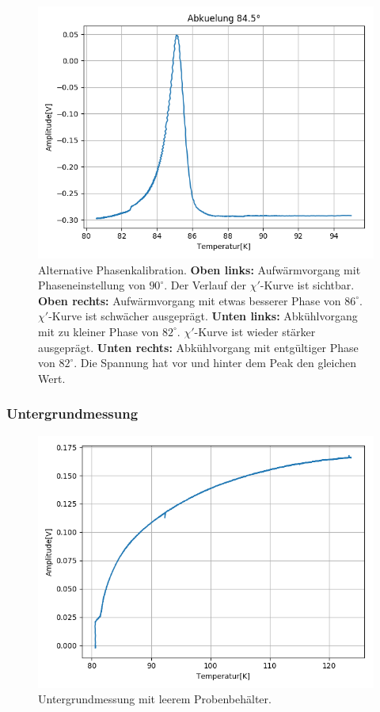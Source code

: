 \documentclass[12pt,a4paper]{article}
\begin{document}
\begin{figure}
\includegraphics[scale=0.5]{Bilder/Haupt_Supra/Kal_3.png}
\caption{Alternative Phasenkalibration. \textbf{Oben links:} Aufwärmvorgang mit Phaseneinstellung von $90^\circ$. Der Verlauf der $\chi'$-Kurve ist sichtbar. \textbf{Oben rechts:} Aufwärmvorgang mit etwas besserer Phase von $86^\circ$. $\chi'$-Kurve ist schwächer ausgeprägt. \textbf{Unten links:} Abkühlvorgang mit zu kleiner Phase von $82^\circ$. $\chi'$-Kurve ist wieder stärker ausgeprägt. \textbf{Unten rechts:} Abkühlvorgang mit entgültiger  Phase von $82^\circ$. Die Spannung hat vor und hinter dem Peak den gleichen Wert.}
\label{fig:Supra_Kali}
\end{figure}

\subsubsection{Untergrundmessung}
\begin{figure}
\centering
\includegraphics[scale=0.8]{Bilder/Haupt_Supra/Untergrund.png}
\caption{Untergrundmessung mit leerem Probenbehälter.}
\label{fig:Supra_Untergrund}
\end{figure}
\end{document}
